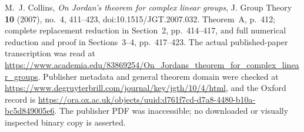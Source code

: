 M.~J. Collins,
\emph{On Jordan's theorem for complex linear groups},
J. Group Theory \textbf{10} (2007), no.~4, 411--423,
doi:10.1515/JGT.2007.032.
Theorem~A, p.~412; complete replacement reduction in Section~2,
pp.~414--417, and full numerical reduction and proof in
Sections~3--4, pp.~417--423.
The actual published-paper transcription was read at
\url{https://www.academia.edu/83869254/On_Jordans_theorem_for_complex_linear_groups}.
Publisher metadata and general theorem domain were checked at
\url{https://www.degruyterbrill.com/journal/key/jgth/10/4/html},
and the Oxford record is
\url{https://ora.ox.ac.uk/objects/uuid:d761f7cd-d7a8-4480-b10a-bc5d849005e6}.
The publisher PDF was inaccessible; no downloaded or visually
inspected binary copy is asserted.

